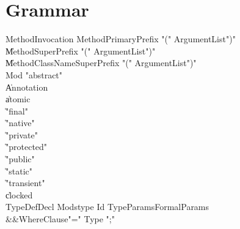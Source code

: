 \chapter{Grammar}


\begin{grammar}

 MethodInvocation  \:   MethodPrimaryPrefix  \xcd"("  ArgumentList\opt  \xcd")"\\
    \|   MethodSuperPrefix  \xcd"("  ArgumentList\opt  \xcd")"\\
    \|   MethodClassNameSuperPrefix  \xcd"("  ArgumentList\opt  \xcd")"\\
 Mod  \:   \xcd"abstract"\\
    \|   Annotation\\
    \|   atomic\\
    \|   \xcd"final"\\
    \|   \xcd"native"\\
    \|   \xcd"private"\\
    \|   \xcd"protected"\\
    \|   \xcd"public"\\
    \|   \xcd"static"\\
    \|   \xcd"transient"\\
    \|   clocked\\
 TypeDefDecl  \:   Mods\opt  type  Id  TypeParams\opt  FormalParams\opt\\
          &&WhereClause\opt  \xcd"="  Type  \xcd";"\\
\end{grammar}

